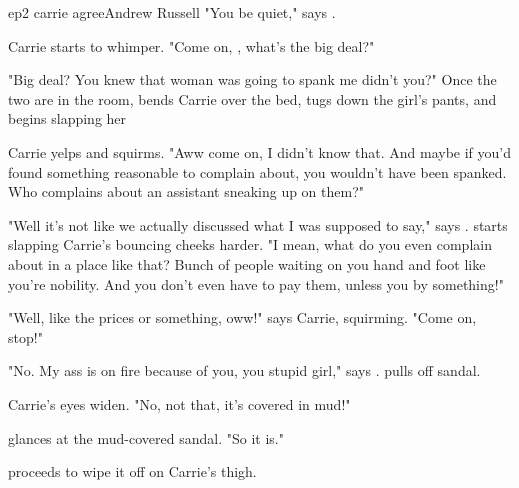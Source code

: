 \documentclass{book}
\begin{document}
\begin{childnode}{ep2 carrie agree}{Andrew Russell}
     "You be quiet," says \name{}. 




     Carrie starts to whimper. "Come on, \name{}, what's the big deal?"

     "Big deal? You knew that woman was going to spank me didn't you?" Once the two are in the room, \name{} bends Carrie over the bed, tugs down the girl's pants, and begins slapping her

     Carrie yelps and squirms. "Aww come on, I didn't know that. And maybe if you'd found something reasonable to complain about, you wouldn't have been spanked. Who complains about an assistant 
     sneaking up on them?"

     "Well it's not like we actually discussed what I was supposed to say," says \name{}. \HeShe{} starts slapping Carrie's bouncing cheeks harder. "I mean, what do you even complain about in 
     a place like that? Bunch of people waiting on you hand and foot like you're nobility. And you don't even have to pay them, unless you by something!" 

     "Well, like the prices or something, oww!" says Carrie, squirming. "Come on, \nickname{} stop!"

     "No. My ass is on fire because of you, you stupid girl," says \name{}. \HeShe{} pulls off \hisher{} sandal.

     Carrie's eyes widen. "No, not that, it's covered in mud!"

     \name{} glances at the mud-covered sandal. "So it is."

     \name{} proceeds to wipe it off on Carrie's thigh.


\end{childnode}
\end{document}
